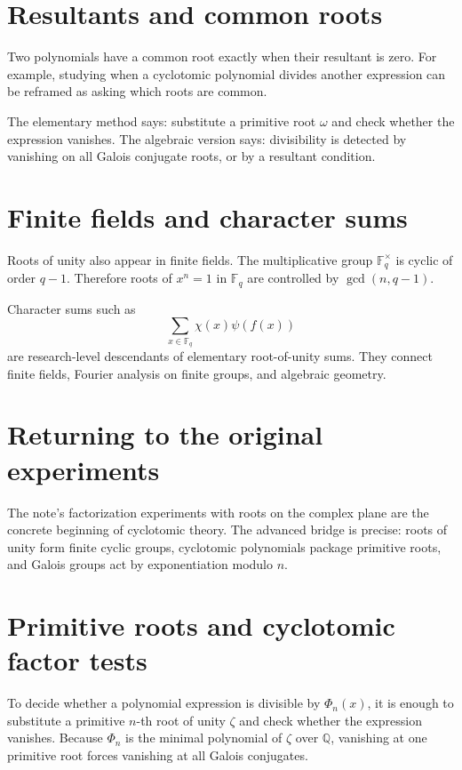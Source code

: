 \section{Resultants and common roots}

Two polynomials have a common root exactly when their resultant is zero.  For example, studying when a cyclotomic polynomial divides another expression can be reframed as asking which roots are common.

The elementary method says: substitute a primitive root $\omega$ and check whether the expression vanishes.  The algebraic version says: divisibility is detected by vanishing on all Galois conjugate roots, or by a resultant condition.

\section{Finite fields and character sums}

Roots of unity also appear in finite fields.  The multiplicative group $\mathbb F_q^\times$ is cyclic of order $q-1$.  Therefore roots of $x^n=1$ in $\mathbb F_q$ are controlled by $\gcd(n,q-1)$.

Character sums such as
\[
  \sum_{x\in\mathbb F_q}\chi(x)\psi(f(x))
\]
are research-level descendants of elementary root-of-unity sums.  They connect finite fields, Fourier analysis on finite groups, and algebraic geometry.

\section{Returning to the original experiments}

The note's factorization experiments with roots on the complex plane are the concrete beginning of cyclotomic theory.  The advanced bridge is precise: roots of unity form finite cyclic groups, cyclotomic polynomials package primitive roots, and Galois groups act by exponentiation modulo $n$.

\section{Primitive roots and cyclotomic factor tests}

To decide whether a polynomial expression is divisible by $\Phi_n(x)$, it is enough to substitute a primitive $n$-th root of unity $\zeta$ and check whether the expression vanishes.  Because $\Phi_n$ is the minimal polynomial of $\zeta$ over $\mathbb Q$, vanishing at one primitive root forces vanishing at all Galois conjugates.

